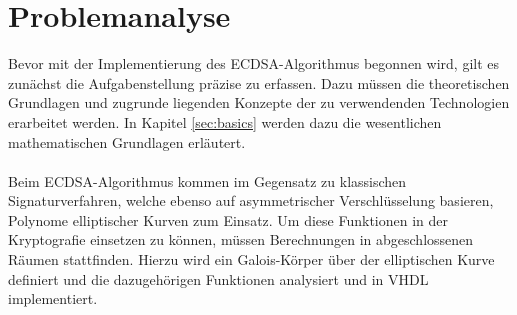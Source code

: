 \section{Problemanalyse}
Bevor mit der Implementierung des ECDSA-Algorithmus begonnen wird, gilt es zunächst die Aufgabenstellung präzise zu erfassen. Dazu müssen die theoretischen Grundlagen und zugrunde liegenden Konzepte der zu verwendenden Technologien erarbeitet werden. In Kapitel \ref{sec:basics} werden dazu die wesentlichen mathematischen Grundlagen erläutert. 
\\ \\
Beim ECDSA-Algorithmus kommen im Gegensatz zu klassischen Signaturverfahren, welche ebenso auf asymmetrischer Verschlüsselung basieren, Polynome elliptischer Kurven zum Einsatz. Um diese Funktionen in der Kryptografie einsetzen zu können, müssen Berechnungen in abgeschlossenen Räumen stattfinden. Hierzu wird ein Galois-Körper über der elliptischen Kurve definiert und die dazugehörigen Funktionen analysiert und in VHDL implementiert.